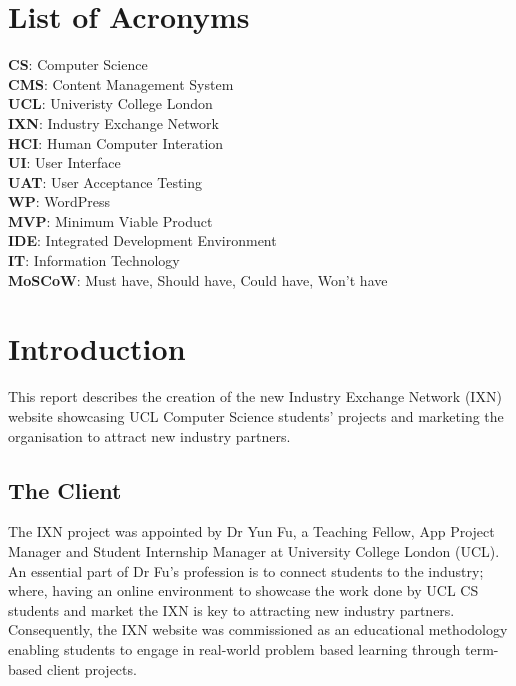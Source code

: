 \documentclass[fontsize=11pt]{extarticle}
\numberwithin{figure}{section} %
\numberwithin{table}{section}%
\begin{document}
\newpage

\section*{List of Acronyms}\label{acronyms}
\textbf{CS}: Computer Science \\
\textbf{CMS}: Content Management System \\
\textbf{UCL}: Univeristy College London \\
\textbf{IXN}: Industry Exchange Network \\
\textbf{HCI}: Human Computer Interation \\
\textbf{UI}: User Interface \\
\textbf{UAT}: User Acceptance Testing \\
\textbf{WP}: WordPress \\
\textbf{MVP}: Minimum Viable Product \\
\textbf{IDE}: Integrated Development Environment \\
\textbf{IT}: Information Technology \\
\textbf{MoSCoW}: Must have, Should have, Could have, Won't have \\


\newpage

\clearpage
{}
\hypertarget{introduction}{%
\section{Introduction}\label{introduction}}

This report describes the creation of the new Industry Exchange Network
(IXN) website showcasing UCL Computer Science students' projects and
marketing the organisation to attract new industry partners.

\hypertarget{the-client}{%
\subsection{The Client}\label{the-client}}

The IXN project was appointed by Dr Yun Fu, a Teaching Fellow, App
Project Manager and Student Internship Manager at University College
London (UCL). An essential part of Dr Fu's profession is to connect
students to the industry; where, having an online environment to
showcase the work done by UCL CS students and market the IXN is key to
attracting new industry partners. Consequently, the IXN website was
commissioned as an educational methodology enabling students to engage
in real-world problem based learning through term-based client projects.
\end{document}
